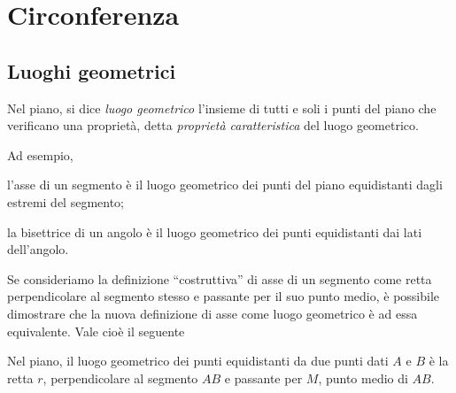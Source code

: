 
\chapter{Circonferenza}\label{chap:circonferenza}


\section{Luoghi geometrici}\label{sect:luoghi_geometrici}

\begin{definizione}
Nel piano, si dice \emph{luogo geometrico} l'insieme di tutti e soli 
i punti del piano che verificano una proprietà, detta \emph{proprietà 
caratteristica} del luogo geometrico.
\end{definizione}
Ad esempio,
\begin{itemize*}
\item l'asse di un segmento è il luogo geometrico dei punti del piano 
equidistanti dagli estremi del segmento;
\item la bisettrice di un angolo è il luogo geometrico dei punti 
equidistanti dai lati dell'angolo.
\end{itemize*}
Se consideriamo la definizione ``costruttiva'' di asse di un segmento 
come retta perpendicolare al segmento stesso e passante per il suo 
punto medio, è possibile dimostrare che la nuova definizione di asse 
come luogo geometrico è ad essa equivalente.
Vale cioè il seguente
\begin{teorema}
Nel piano, il luogo geometrico dei punti equidistanti da due punti 
dati $A$ e $B$ è la retta $r$, perpendicolare al segmento $AB$ e 
passante per $M$, punto medio di $AB$.
\end{teorema}

